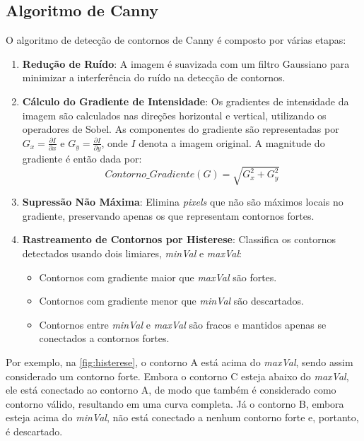 \subsection{Algoritmo de Canny}

O algoritmo de detecção de contornos de Canny é composto por várias etapas:
\begin{enumerate}
    \item \textbf{Redução de Ruído}: A imagem é suavizada com um filtro Gaussiano para minimizar a interferência do ruído na detecção de contornos.
    \item \textbf{Cálculo do Gradiente de Intensidade}: Os gradientes de intensidade da imagem são calculados nas direções horizontal e vertical, utilizando os operadores de Sobel. As componentes do gradiente são representadas por \( G_x = \frac{\partial I}{\partial x} \) e \( G_y = \frac{\partial I}{\partial y} \), onde \( I \) denota a imagem original. A magnitude do gradiente é então dada por:
    \[Contorno\_Gradiente(G) = \sqrt{G_{x}^{2} + G_{y}^{2}}\]
    \item \textbf{Supressão Não Máxima}: Elimina \textit{pixels} que não são máximos locais no gradiente, preservando apenas os que representam contornos fortes.
    \item \textbf{Rastreamento de Contornos por Histerese}: Classifica os contornos detectados usando dois limiares, \textit{minVal} e \textit{maxVal}:
    \begin{itemize}
        \item Contornos com gradiente maior que \textit{maxVal} são fortes.
        \item Contornos com gradiente menor que \textit{minVal} são descartados.
        \item Contornos entre \textit{minVal} e \textit{maxVal} são fracos e mantidos apenas se conectados a contornos fortes.
    \end{itemize}
\end{enumerate}

Por exemplo, na \autoref{fig:histerese}, o contorno A está acima do \textit{maxVal}, sendo assim considerado um contorno forte. Embora o contorno C esteja abaixo do \textit{maxVal}, ele está conectado ao contorno A, de modo que também é considerado como contorno válido, resultando em uma curva completa. Já o contorno B, embora esteja acima do \textit{minVal}, não está conectado a nenhum contorno forte e, portanto, é descartado.


